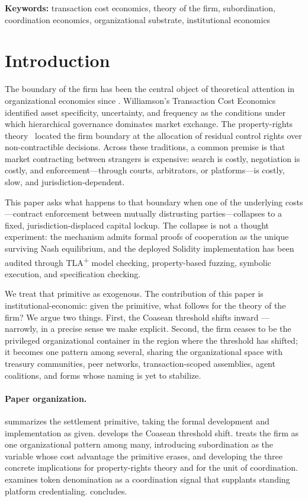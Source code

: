 \documentclass[11pt,a4paper]{article}
\theoremstyle{definition}
\theoremstyle{remark}
\begin{document}
\medskip
\noindent\textbf{Keywords:}
transaction cost economics, theory of the firm, subordination,
coordination economics, organizational substrate, institutional
economics

\section{Introduction}
\label{sec:intro}

The boundary of the firm has been the central object of theoretical
attention in organizational economics since
\citet{coase1937}. Williamson's Transaction Cost
Economics~\citep{williamson1985} identified asset specificity,
uncertainty, and frequency as the conditions under which
hierarchical governance dominates market exchange. The
property-rights theory~\citep{hart1995} located the firm boundary at
the allocation of residual control rights over non-contractible
decisions. Across these traditions, a common premise is that market
contracting between strangers is expensive: search is costly,
negotiation is costly, and enforcement---through courts,
arbitrators, or platforms---is costly, slow, and
jurisdiction-dependent.

This paper asks what happens to that boundary when one of the
underlying costs---contract enforcement between mutually distrusting
parties---collapses to a fixed, jurisdiction-displaced capital
lockup. The collapse is not a thought experiment: the mechanism
admits formal proofs of cooperation as the unique surviving Nash
equilibrium, and the deployed Solidity implementation has been
audited through TLA\textsuperscript{+} model checking,
property-based fuzzing,
symbolic execution, and specification checking.

We treat that primitive as exogenous. The contribution of this paper
is institutional-economic: given the primitive, what follows for the
theory of the firm? We argue two things. First, the Coasean
threshold shifts inward --- narrowly, in a precise sense we make
explicit. Second, the firm ceases to be the privileged organizational
container in the region where the threshold has shifted; it becomes
one pattern among several, sharing the organizational space with
treasury communities, peer networks, transaction-scoped assemblies,
agent coalitions, and forms whose naming is yet to stabilize.

\paragraph{Paper organization.}
 summarizes the settlement primitive,
taking the formal development and implementation as given.
 develops the Coasean threshold shift.
 treats the firm as one organizational pattern
among many, introducing subordination as the variable whose cost
advantage the primitive erases, and developing the three concrete
implications for property-rights theory and for the unit of
coordination.
 examines token denomination as a coordination
signal that supplants standing platform credentialing.
 concludes.
\end{document}
